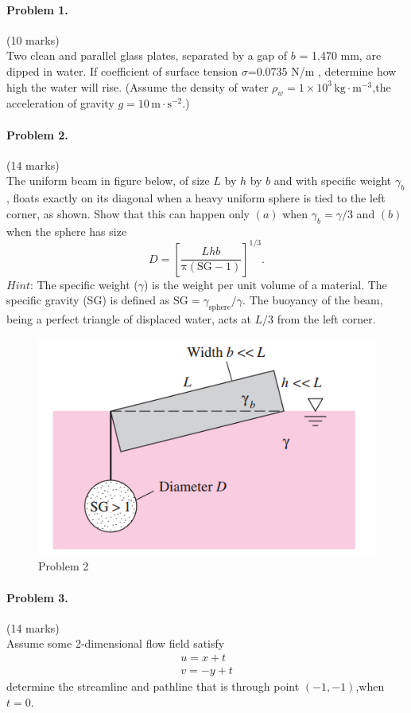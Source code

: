 \documentclass[12pt]{article}
\begin{document}
\newpage
\paragraph{Problem 1.}\hfill (10 marks)\\
Two clean and parallel glass plates, separated by a gap of $b$ = 1.470 mm, are dipped in water. If coefficient of surface tension $\sigma$=0.0735 N/m , determine how high the water will rise.
(Assume the density of water $\rho_w=1 \times \mathrm{10^3 \, kg\cdot m^{-3}}$,the acceleration of gravity $g=\mathrm{10 \, m\cdot s^{-2}}$.)



\paragraph{Problem 2.}\hfill (14 marks)\\
The uniform beam in figure below, of size $L$ by $h$ by $b$ and with specific weight $\gamma_b$, floats exactly on its diagonal when a heavy uniform sphere is tied to the left corner, as shown. Show that this can happen only $(a)$ when $\gamma_b=\gamma/3$ and $(b)$ when the sphere has size
\begin{equation*}
D = \left[\frac{Lhb}{\mathrm{\pi}(\mathrm{SG} - 1)}\right]^{1/3}.
\end{equation*}
$Hint$: The specific weight ($\gamma$) is the weight per unit volume of a material. The specific gravity (SG) is defined as $\mathrm{SG} = \gamma_{\mathrm{sphere}}/\gamma$. The buoyancy of the beam, being a perfect triangle of displaced water, acts at $L/3$ from the left corner.

\begin{figure}[hb]
	\centering
	\includegraphics[width=0.5\linewidth]{"figs/problem 2A"}
	\caption{Problem 2}
	\label{fig:problem-2}
\end{figure}



\paragraph{Problem 3.}\hfill (14 marks)\\
Assume some 2-dimensional flow field satisfy
\begin{align*}
u=x+t\\
v=-y+t
\end{align*}
determine the streamline and pathline that is through point $(-1,-1)$,when $t=0$.
	
\end{document}
